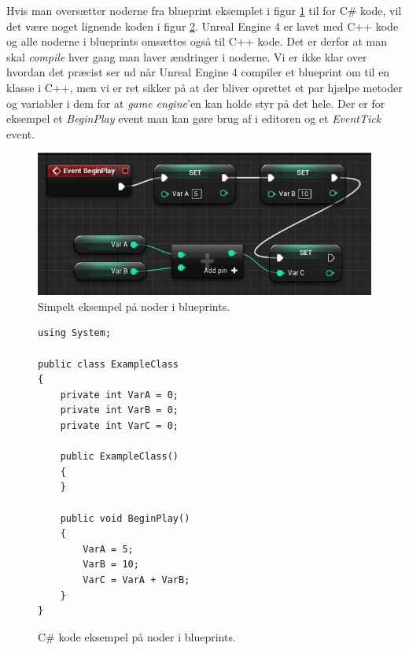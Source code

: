 Hvis man oversætter noderne fra blueprint eksemplet i figur \ref{dia:codeblueprint1} til for C\# kode, vil det være noget lignende koden i figur \ref{dia:codeblueprint2}. Unreal Engine 4 er lavet med C++ kode og alle noderne i blueprints omsættes også til C++ kode. Det er derfor at man skal \textit{compile} hver gang man laver ændringer i noderne. Vi er ikke klar over hvordan det præcist ser ud når Unreal Engine 4 compiler et blueprint om til en klasse i C++, men vi er ret sikker på at der bliver oprettet et par hjælpe metoder og variabler i dem for at \textit{game engine}'en kan holde styr på det hele. Der er for eksempel et \textit{BeginPlay} event man kan gøre brug af i editoren og et \textit{EventTick} event.

\begin{figure}
	\begin{center}
		\caption{Simpelt eksempel på noder i blueprints.}
		\label{dia:codeblueprint1}
		\includegraphics[width=0.98\linewidth]{pictures/blueprints/blueprint-example}
		\end{center}
\end{figure}

\begin{figure}
\caption{C\# kode eksempel på noder i blueprints.}
\label{dia:codeblueprint2}
\begin{lstlisting}
using System;

public class ExampleClass
{
    private int VarA = 0;
    private int VarB = 0;
    private int VarC = 0;

    public ExampleClass()
    {
    }
    
    public void BeginPlay()
    {
        VarA = 5;
        VarB = 10;
        VarC = VarA + VarB;
    }
}
\end{lstlisting}
\end{figure}